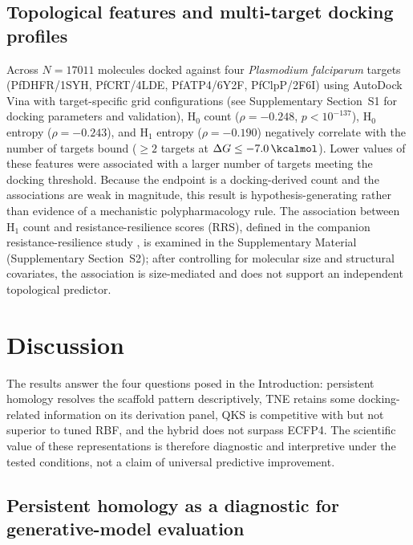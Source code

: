 \documentclass[11pt,a4paper]{article}
\begin{document}
\subsection{Topological features and multi-target docking profiles}
\label{sec:tda_promiscuity}

Across $N = \num{17011}$ molecules docked against four \textit{Plasmodium falciparum} targets (PfDHFR/1SYH, PfCRT/4LDE, PfATP4/6Y2F, PfClpP/2F6I) using AutoDock Vina with target-specific grid configurations (see Supplementary Section~S1 for docking parameters and validation), H$_0$ count ($\rho = -\num{0.248}$, $p < 10^{-137}$), H$_0$ entropy ($\rho = -\num{0.243}$), and H$_1$ entropy ($\rho = -\num{0.190}$) negatively correlate with the number of targets bound ($\geq 2$ targets at $\Delta G \leq -\SI{7.0}{\kcalmol}$). Lower values of these features were associated with a larger number of targets meeting the docking threshold. Because the endpoint is a docking-derived count and the associations are weak in magnitude, this result is hypothesis-generating rather than evidence of a mechanistic polypharmacology rule. The association between H$_1$ count and resistance-resilience scores (RRS), defined in the companion resistance-resilience study \citep{temgoua2026tb}, is examined in the Supplementary Material (Supplementary Section~S2); after controlling for molecular size and structural covariates, the association is size-mediated and does not support an independent topological predictor.


\section{Discussion}\label{sec:discussion}

The results answer the four questions posed in the Introduction: persistent homology resolves the scaffold pattern descriptively, TNE retains some docking-related information on its derivation panel, QKS is competitive with but not superior to tuned RBF, and the hybrid does not surpass ECFP4. The scientific value of these representations is therefore diagnostic and interpretive under the tested conditions, not a claim of universal predictive improvement.

\subsection{Persistent homology as a diagnostic for generative-model evaluation}
\end{document}
